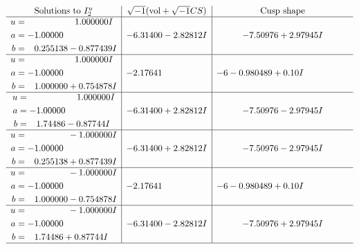 \documentclass[1p]{elsarticle_modified}
\theoremstyle{definition}
\newcommand{\I}{\sqrt{-1}}
\begin{document}
$$\begin{array}{c|c|c}  
\text{Solutions to }I^u_{2}& \I (\text{vol} + \sqrt{-1}CS) & \text{Cusp shape}\\
 \hline 
\begin{aligned}
u &= \phantom{-0.000000 -}1.000000 I \\
a &= -1.00000\phantom{ +0.000000I} \\
b &= \phantom{-}0.255138 - 0.877439 I\end{aligned}
 & -6.31400 - 2.82812 I & -7.50976 + 2.97945 I \\ \hline\begin{aligned}
u &= \phantom{-0.000000 -}1.000000 I \\
a &= -1.00000\phantom{ +0.000000I} \\
b &= \phantom{-}1.000000 + 0.754878 I\end{aligned}
 & -2.17641\phantom{ +0.000000I} &                  -6
-0.980489 + 0. 10   I\phantom{ +0.000000I} \\ \hline\begin{aligned}
u &= \phantom{-0.000000 -}1.000000 I \\
a &= -1.00000\phantom{ +0.000000I} \\
b &= \phantom{-}1.74486 - 0.87744 I\end{aligned}
 & -6.31400 + 2.82812 I & -7.50976 - 2.97945 I \\ \hline\begin{aligned}
u &= \phantom{-0.000000 } -1.000000 I \\
a &= -1.00000\phantom{ +0.000000I} \\
b &= \phantom{-}0.255138 + 0.877439 I\end{aligned}
 & -6.31400 + 2.82812 I & -7.50976 - 2.97945 I \\ \hline\begin{aligned}
u &= \phantom{-0.000000 } -1.000000 I \\
a &= -1.00000\phantom{ +0.000000I} \\
b &= \phantom{-}1.000000 - 0.754878 I\end{aligned}
 & -2.17641\phantom{ +0.000000I} &                  -6
-0.980489 + 0. 10   I\phantom{ +0.000000I} \\ \hline\begin{aligned}
u &= \phantom{-0.000000 } -1.000000 I \\
a &= -1.00000\phantom{ +0.000000I} \\
b &= \phantom{-}1.74486 + 0.87744 I\end{aligned}
 & -6.31400 - 2.82812 I & -7.50976 + 2.97945 I\\
 \hline 
 \end{array}$$\newpage\newpage\renewcommand{\arraystretch}{1}
\end{document}
